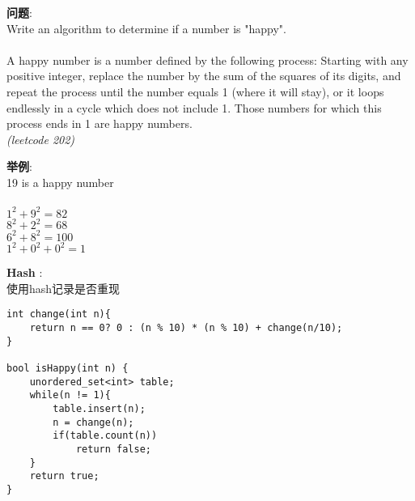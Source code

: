    
\begin{description}
    \item{\textbf{问题}}:\\
Write an algorithm to determine if a number is "happy". \\
\\
A happy number is a number defined by the following process: Starting with any positive integer, replace the number by the sum of the squares of its digits, and repeat the process until the number equals 1 (where it will stay), or it loops endlessly in a cycle which does not include 1. Those numbers for which this process ends in 1 are happy numbers.\\
\textit{(leetcode 202)}
    \item{\textbf{举例}}:\\
19 is a happy number \\
\\
$1^2 + 9^2 = 82$\\
$8^2 + 2^2 = 68$\\
$6^2 + 8^2 = 100$\\
$1^2 + 0^2 + 0^2 = 1$\\
    \item{\textbf{Hash}} : 
    \\使用hash记录是否重现
    \begin{lstlisting}
int change(int n){
	return n == 0? 0 : (n % 10) * (n % 10) + change(n/10);
}

bool isHappy(int n) {
	unordered_set<int> table;
	while(n != 1){
		table.insert(n);
		n = change(n);
		if(table.count(n))
			return false;
	}
	return true;
}
    \end{lstlisting}
\end{description}
